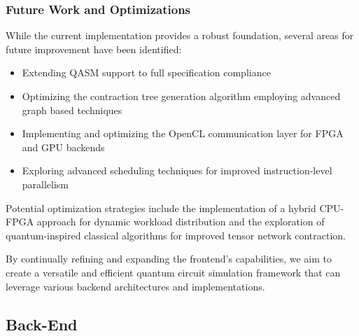 \documentclass[12pt,oneside,a4paper]{article}
\begin{document}

\subsubsection{Future Work and Optimizations}

While the current implementation provides a robust foundation, several areas for future improvement have been identified:

\begin{itemize}
    \item Extending QASM support to full specification compliance
    \item Optimizing the contraction tree generation algorithm employing advanced graph based techniques \cite{PhysRevE.90.033315}
    \item Implementing and optimizing the OpenCL communication layer for FPGA and GPU backends
    \item Exploring advanced scheduling techniques for improved instruction-level parallelism
\end{itemize}

Potential optimization strategies include the implementation of a hybrid CPU-FPGA approach for dynamic workload distribution and the exploration of quantum-inspired classical algorithms for improved tensor network contraction.

By continually refining and expanding the frontend's capabilities, we aim to create a versatile and efficient quantum circuit simulation framework that can leverage various backend architectures and implementations.


\subsection{Back-End}


\end{document}
